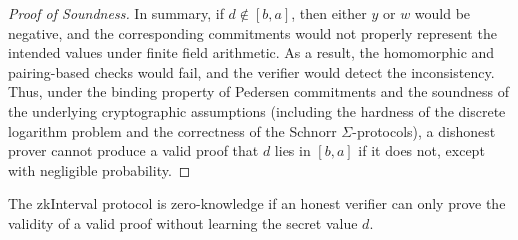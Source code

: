 \documentclass{iacrcc}
\theoremstyle{definition}
\begin{document}
\begin{proof}[Proof of Soundness]
  In summary, if \( d \notin [b, a] \), then either \( y \) or \( w \) would be negative, and the corresponding commitments would not properly represent the intended values under finite field arithmetic. As a result, the homomorphic and pairing-based checks would fail, and the verifier would detect the inconsistency. Thus, under the binding property of Pedersen commitments and the soundness of the underlying cryptographic assumptions (including the hardness of the discrete logarithm problem and the correctness of the Schnorr \(\Sigma\)-protocols), a dishonest prover cannot produce a valid proof that \( d \) lies in \([b, a]\) if it does not, except with negligible probability.
\end{proof}

The zkInterval protocol is zero-knowledge if an honest verifier can only prove the validity of a valid proof without learning the secret value \(d\).
\end{document}
